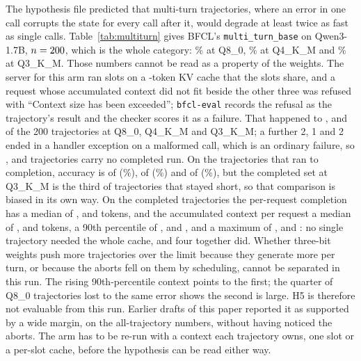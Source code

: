 \documentclass[12pt,letterpaper]{article}
\newcommand{\bfcl}{BFCL}
\newcommand{\qm}{Qwen3-1.7B}
\begin{document}
The hypothesis file predicted that multi-turn trajectories, where an error in one call corrupts the state for every call after it, would degrade at least twice as fast as single calls. Table~\ref{tab:multiturn} gives \bfcl{}'s \texttt{multi\_turn\_base} on \qm{}, $n=200{}$, which is the whole category: \qtMtAccEight{}\% at Q8\_0, \qtMtAccFour{}\% at Q4\_K\_M and \qtMtAccThree{}\% at Q3\_K\_M. Those numbers cannot be read as a property of the weights. The server for this arm ran \qtMtSlots{} slots on a \qtMtCtxSlot{}-token KV cache that the slots share, and a request whose accumulated context did not fit beside the other three was refused with ``Context size has been exceeded''; \texttt{bfcl-eval} records the refusal as the trajectory's result and the checker scores it as a failure. That happened to \qtMtCtxErrEight{}, \qtMtCtxErrFour{} and \qtMtCtxErrThree{} of the 200 trajectories at Q8\_0, Q4\_K\_M and Q3\_K\_M; a further 2, 1 and 2 ended in a handler exception on a malformed call, which is an ordinary failure, so \qtMtAbortedEight{}, \qtMtAbortedFour{} and \qtMtAbortedThree{} trajectories carry no completed run. On the trajectories that ran to completion, accuracy is \qtMtCompletedCorrectEight{} of \qtMtCompletedEight{} (\qtMtCompletedAccEight{}\%), \qtMtCompletedCorrectFour{} of \qtMtCompletedFour{} (\qtMtCompletedAccFour{}\%) and \qtMtCompletedCorrectThree{} of \qtMtCompletedThree{} (\qtMtCompletedAccThree{}\%), but the completed set at Q3\_K\_M is the third of trajectories that stayed short, so that comparison is biased in its own way. On the completed trajectories the per-request completion has a median of \qtMtReqMedEight{}, \qtMtReqMedFour{} and \qtMtReqMedThree{} tokens, and the accumulated context per request a median of \qtMtCtxMedEight{}, \qtMtCtxMedFour{} and \qtMtCtxMedThree{} tokens, a 90th percentile of \qtMtCtxPninezeroEight{}, \qtMtCtxPninezeroFour{} and \qtMtCtxPninezeroThree{}, and a maximum of \qtMtCtxMaxEight{}, \qtMtCtxMaxFour{} and \qtMtCtxMaxThree{}: no single trajectory needed the whole cache, and four together did. Whether three-bit weights push more trajectories over the limit because they generate more per turn, or because the aborts fell on them by scheduling, cannot be separated in this run. The rising 90th-percentile context points to the first; the quarter of Q8\_0 trajectories lost to the same error shows the second is large. H5 is therefore not evaluable from this run. Earlier drafts of this paper reported it as supported by a wide margin, on the all-trajectory numbers, without having noticed the aborts. The arm has to be re-run with a context each trajectory owns, one slot or a per-slot cache, before the hypothesis can be read either way.
\end{document}
